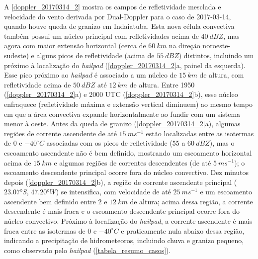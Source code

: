 A \autoref{doppler_20170314_2} mostra os campos de refletividade mesclada e velocidade do vento derivada por Dual-Doppler para o caso de 2017-03-14, quando houve queda de granizo em Indaiatuba. Esta nova célula convectiva também possui um núcleo principal com refletividades acima de $40\:dBZ$, mas agora com maior extensão horizontal (cerca de $60\:km$ na direção noroeste-sudeste) e alguns picos de refletividade (acima de $55\:dBZ$) distintos, incluindo um próximo à localização do \textit{hailpad} (\autoref{doppler_20170314_2}a, painel da esquerda). Esse pico próximo ao \textit{hailpad} é associado a um núcleo de $15\:km$ de altura, com refletividade acima de $50\:dBZ$ até $12\:km$ de altura. Entre 1950 (\autoref{doppler_20170314_2}a) e 2000 UTC (\autoref{doppler_20170314_2}b), esse núcleo enfraquece (refletividade máxima e extensão vertical diminuem) ao mesmo tempo em que a área convectiva expande horizontalmente ao fundir com um sistema menor à oeste. Antes da queda de granizo (\autoref{doppler_20170314_2}a), algumas regiões de corrente ascendente de até $15\:ms^{-1}$ estão localizadas entre as isotermas de 0 e $-40^{\circ}C$ associadas com os picos de refletividade (55 a $60\:dBZ$), mas o escoamento ascendente não é bem definido, mostrando um escoamento horizontal acima de $15\:km$ e algumas regiões de correntes descendentes (de até $5\:ms^{-1}$); o escoamento descendente principal ocorre fora do núcleo convectivo. Dez minutos depois (\autoref{doppler_20170314_2}b), a região de corrente ascendente principal ($\ang{23.07}S$, $\ang{47.20}W$) se intensifica, com velocidade de até $25\:ms^{-1}$ e um escoamento ascendente bem definido entre 2 e $12\:km$ de altura; acima dessa região, a corrente descendente é mais fraca e o escoamento descendente principal ocorre fora do núcleo convectivo. Próximo à localização do \textit{hailpad}, a corrente ascendente é mais fraca entre as isotermas de 0 e $-40^{\circ}C$ e praticamente nula abaixo dessa região, indicando a precipitação de hidrometeoros, incluindo chuva e granizo pequeno, como observado pelo \textit{hailpad} (\autoref{tabela_resumo_casos}).

